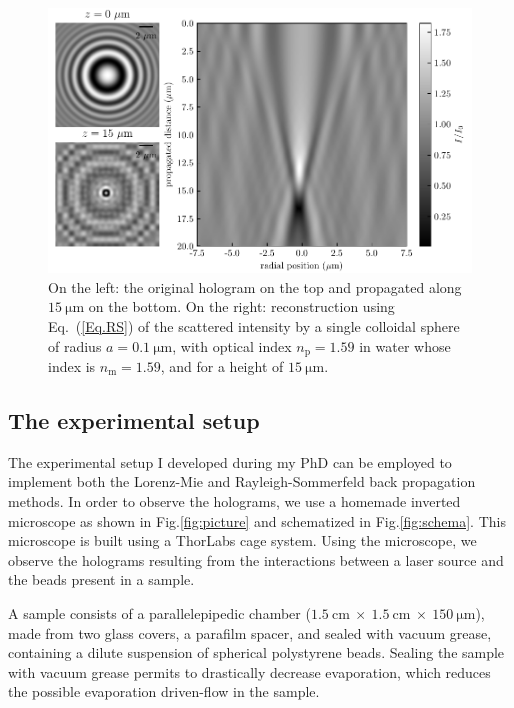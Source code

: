 \begin{figure}[!ht]
	\centering
	\includegraphics{02_body/chapter2/images/Back-propagation/backpropagation.pdf}
	\caption{On the left: the original hologram on the top and propagated along $15 ~ \mathrm{\mu m}$ on the bottom. On the right: reconstruction using Eq.~(\ref{Eq.RS}) of the scattered intensity by a single colloidal sphere of radius $a = 0.1 ~ \mathrm{\mu m}$, with optical index $n_\mathrm{p} = 1.59$ in water whose index is $n_\mathrm{m} = 1.59$, and for a height of $15 ~ \mathrm{\mu m}$.~\href{https://github.com/eXpensia/Confined-Brownian-Motion/blob/main/02_body/chapter2/images/Back-propagation/Back-propagation.ipynb}{\faGithub}}
	\label{fig.sommerfeld}
\end{figure}



\subsection{The experimental setup}
\label{chap:exp-setup}

The experimental setup I developed during my PhD can be employed to implement both the Lorenz-Mie and Rayleigh-Sommerfeld back propagation methods. In order to observe the holograms, we use a homemade inverted microscope as shown in Fig.\ref{fig:picture} and schematized in Fig.\ref{fig:schema}. This microscope is built using a ThorLabs cage system. Using the microscope, we observe the holograms resulting from the interactions between a laser source and the beads present in a sample. 

A sample consists of a parallelepipedic chamber ($1.5 ~ \text{cm} ~ \times ~ 1.5 ~ \text{cm} ~ \times ~ 150 ~ \mathrm{\mu m} $), made from two glass covers, a parafilm spacer, and sealed with vacuum grease, containing a dilute suspension of spherical polystyrene beads. Sealing the sample with vacuum grease permits to drastically decrease evaporation, which reduces the possible evaporation driven-flow in the sample.

